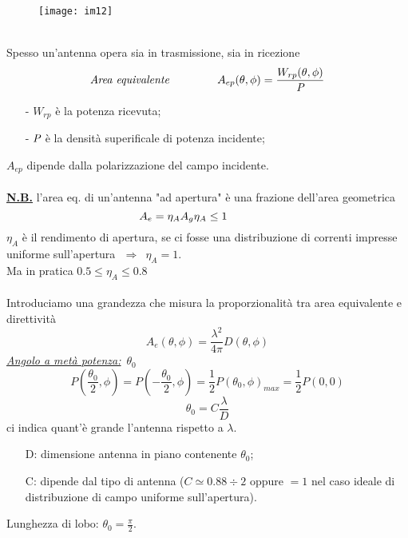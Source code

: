 \documentclass[a4paper]{article}
\begin{document}
\begin{figure}[ht] 
\centering
\texttt{[image: im12]}
\end{figure}
\\Spesso un'antenna opera sia in trasmissione, sia in ricezione
\begin{equation*}
\text{\emph{Area equivalente}}\hspace{15mm}A_{ep}(\theta,\phi)=\frac{W_{rp}(\theta,\phi)}{\emph{P}}
\end{equation*}
\begin{itemize}
\item[-] $W_{rp}$ è la potenza ricevuta;
\item[-] $\emph{P}$ è la densità superificale di potenza incidente;
\end{itemize}
$A_{ep}$ dipende dalla polarizzazione del campo incidente.\\\\
\underline{\textbf{N.B.}} l'area eq. di un'antenna "ad apertura" è una frazione dell'area geometrica
\begin{equation*}
A_e=\eta_AA_g\hspace{15mm\eta_A\leq1}
\end{equation*}
$\eta_A$ è il rendimento di apertura, se ci fosse una distribuzione di correnti impresse uniforme sull’apertura $\,\,\Rightarrow\,\,\,\eta_A=1$.\\
Ma in pratica $0.5\leq\eta_A\leq0.8$\\\\
Introduciamo una grandezza che misura la proporzionalità tra area equivalente e direttività
\begin{equation*}
A_{e}(\theta,\phi)=\frac{\lambda^2}{4\pi}D(\theta,\phi)
\end{equation*}
\underline{\emph{Angolo a metà potenza:}} $\,\theta_0$
\begin{equation*}
P(\frac{\theta_0}{2},\phi)=P(-\frac{\theta_0}{2},\phi)=\frac{1}{2}P(\theta_0,\phi)_{max}=\frac{1}{2}P(0,0)
\end{equation*}
\begin{equation*}
\theta_0=C\frac{\lambda}{D}
\end{equation*}
\hspace*{4mm}ci indica quant'è grande l'antenna rispetto a $\lambda$.
\begin{itemize}
\item[D:] dimensione antenna in piano contenente $\theta_0$;
\item[C:] dipende dal tipo di antenna ($C\simeq0.88\div2$ oppure $=1$ nel caso ideale di distribuzione di campo uniforme sull’apertura).
\end{itemize}
Lunghezza di lobo: $\theta_0 = \frac{\pi}{2}$.
\end{document}
